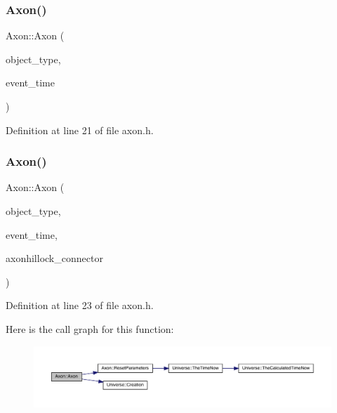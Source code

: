 \mbox{\label{class_axon_a0ca4cd87ad4a2719c6b7c8c3d46dcbc6}} 
\subsubsection{\texorpdfstring{Axon()}{Axon()}\hspace{0.1cm}{\footnotesize\ttfamily [3/4]}}
{\footnotesize\ttfamily Axon\+::\+Axon (\begin{DoxyParamCaption}\item[{unsigned int}]{object\+\_\+type,  }\item[{std\+::chrono\+::time\+\_\+point$<$ \mbox{\hyperlink{universe_8h_a0ef8d951d1ca5ab3cfaf7ab4c7a6fd80}{Clock}} $>$}]{event\+\_\+time }\end{DoxyParamCaption})\hspace{0.3cm}{\ttfamily [inline]}}



Definition at line 21 of file axon.\+h.

\mbox{\label{class_axon_afaffed720efb3cb75e46088c5fb81d95}} 
\subsubsection{\texorpdfstring{Axon()}{Axon()}\hspace{0.1cm}{\footnotesize\ttfamily [4/4]}}
{\footnotesize\ttfamily Axon\+::\+Axon (\begin{DoxyParamCaption}\item[{unsigned int}]{object\+\_\+type,  }\item[{std\+::chrono\+::time\+\_\+point$<$ \mbox{\hyperlink{universe_8h_a0ef8d951d1ca5ab3cfaf7ab4c7a6fd80}{Clock}} $>$}]{event\+\_\+time,  }\item[{\mbox{\hyperlink{class_axon_hillock}{Axon\+Hillock}} \&}]{axonhillock\+\_\+connector }\end{DoxyParamCaption})\hspace{0.3cm}{\ttfamily [inline]}}



Definition at line 23 of file axon.\+h.

Here is the call graph for this function\+:\nopagebreak
\begin{figure}[H]
\begin{center}
\leavevmode
\includegraphics[width=350pt]{class_axon_afaffed720efb3cb75e46088c5fb81d95_cgraph}
\end{center}
\end{figure}
\mbox{\label{class_axon_af000507f0ff0527d1743e90d2e756282}} 
